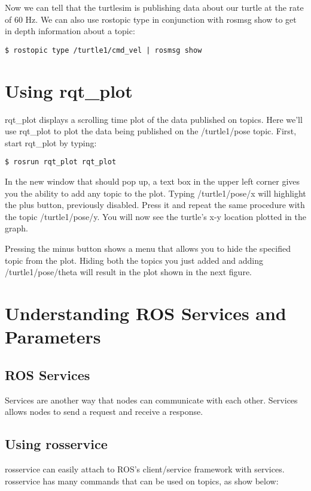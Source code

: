 Now we can tell that the turtlesim is publishing data about our turtle at the rate of 60 Hz. We can also use rostopic type in conjunction with rosmsg show to get in depth information about a topic:

\begin{lstlisting}[breaklines=true languages=bash]
$ rostopic type /turtle1/cmd_vel | rosmsg show
\end{lstlisting}

\section{Using rqt\_plot}

rqt\_plot displays a scrolling time plot of the data published on topics. Here we'll use rqt\_plot to plot the data being published on the /turtle1/pose topic. First, start rqt\_plot by typing:

\begin{lstlisting}[breaklines=true languages=bash]
$ rosrun rqt_plot rqt_plot
\end{lstlisting}
In the new window that should pop up, a text box in the upper left corner gives you the ability to add any topic to the plot. Typing /turtle1/pose/x will highlight the plus button, previously disabled. Press it and repeat the same procedure with the topic /turtle1/pose/y. You will now see the turtle's x-y location plotted in the graph.

Pressing the minus button shows a menu that allows you to hide the specified topic from the plot. Hiding both the topics you just added and adding /turtle1/pose/theta will result in the plot shown in the next figure.

\section{Understanding ROS Services and Parameters}

\subsection{ROS Services}
Services are another way that nodes can communicate with each other. Services allows nodes to send a request and receive a response.

\subsection{Using rosservice}
rosservice can easily attach to ROS's client/service framework with services. rosservice has many commands that can be used on topics, as show below:

